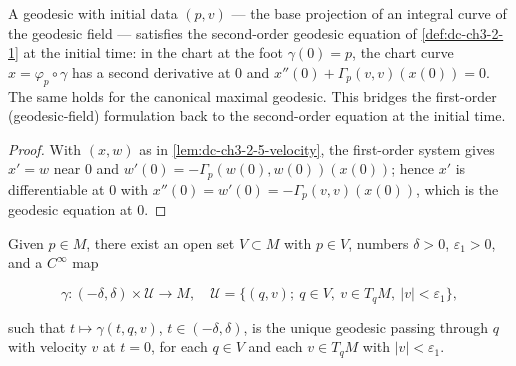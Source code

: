 \begin{lemma}
  \label{lem:dc-ch3-2-5-equation}
  \leanok
  A geodesic with initial data $(p,v)$ — the base projection of an integral
  curve of the geodesic field — satisfies the second-order geodesic equation of
  \cref{def:dc-ch3-2-1} at the initial time: in the chart at the foot
  $\gamma(0)=p$, the chart curve $x=\varphi_p\circ\gamma$ has a second
  derivative at $0$ and $x''(0)+\Gamma_p(v,v)(x(0))=0$. The same holds for the
  canonical maximal geodesic. This bridges the first-order (geodesic-field)
  formulation back to the second-order equation at the initial time.
\end{lemma}
\begin{proof}
  \sketch
  \leanok
  With $(x,w)$ as in \cref{lem:dc-ch3-2-5-velocity}, the first-order system
  gives $x'=w$ near $0$ and $w'(0)=-\Gamma_p(w(0),w(0))(x(0))$; hence $x'$ is
  differentiable at $0$ with
  $x''(0)=w'(0)=-\Gamma_p(v,v)(x(0))$, which is the geodesic equation at $0$.

\end{proof}

\begin{proposition}
  \label{prop:dc-ch3-2-5}
  Given $p\in M$, there exist an open set $V\subset M$ with $p\in V$, numbers
  $\delta>0$, $\varepsilon_1>0$, and a $C^\infty$ map
  
  $$
  \gamma:(-\delta,\delta)\times\mathcal{U}\to M,\quad\mathcal{U}=\{(q,v);\ q\in V,\ v\in T_qM,\ |v|<\varepsilon_1\},
  $$
  
  such that $t\mapsto\gamma(t,q,v)$, $t\in(-\delta,\delta)$, is the unique geodesic
  passing through $q$ with velocity $v$ at $t=0$, for each $q\in V$ and each
  $v\in T_qM$ with $|v|<\varepsilon_1$.
\end{proposition}

